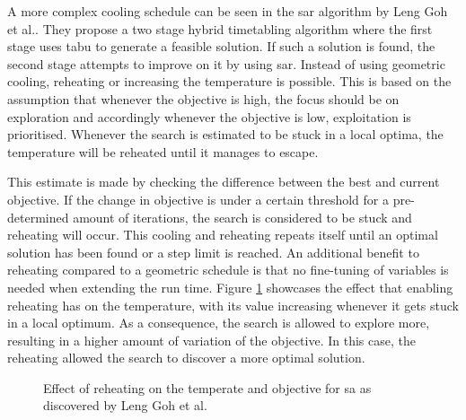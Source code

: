 A more complex cooling schedule can be seen in the \acrfull{sar} algorithm by Leng Goh et al.\cite{Goh2017}. They propose a two stage hybrid timetabling algorithm where the first stage uses \acrlong{tabu} to generate a feasible solution. If such a solution is found, the second stage attempts to improve on it by using \acrshort{sar}. Instead of using geometric cooling, reheating or increasing the temperature is possible. This is based on the assumption that whenever the objective is high, the focus should be on exploration and accordingly whenever the objective is low, exploitation is prioritised. Whenever the search is estimated to be stuck in a local optima, the temperature will be reheated until it manages to escape. 

This estimate is made by checking the difference between the best and current objective. If the change in objective is under a certain threshold for a pre-determined amount of iterations, the search is considered to be stuck and reheating will occur. This cooling and reheating repeats itself until an optimal solution has been found or a step limit is reached. An additional benefit to reheating compared to a geometric schedule is that no fine-tuning of variables is needed when extending the run time. Figure \ref{fig:SAR} showcases the effect that enabling reheating has on the temperature, with its value increasing whenever it gets stuck in a local optimum. As a consequence, the search is allowed to explore more, resulting in a higher amount of variation of the objective. In this case, the reheating allowed the search to discover a more optimal solution.

\begin{figure}[h]
  \centering
  \hfill
  \caption{Effect of reheating on the temperate and objective for \acrlong{sa} as discovered by Leng Goh et al.\cite{Goh2017}}
  \label{fig:SAR}
\end{figure}





